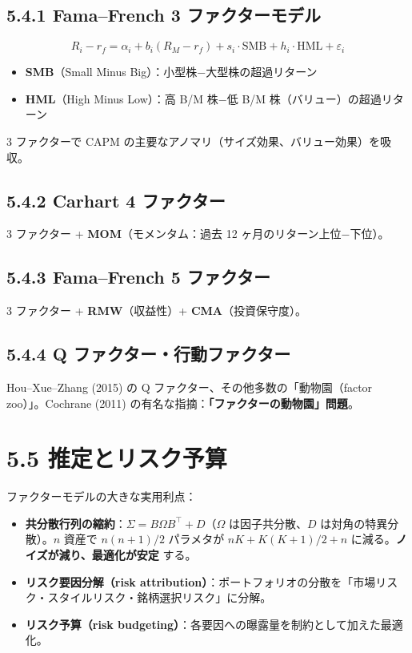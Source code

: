 \documentclass[11pt,a4paper]{report}
\begin{document}
\subsection{5.4.1 Fama–French 3 ファクターモデル}

\[ R_i - r_f = \alpha_i + b_i (R_M - r_f) + s_i \cdot \mathrm{SMB} + h_i \cdot \mathrm{HML} + \varepsilon_i \]
\begin{itemize}
\item \textbf{SMB}（Small Minus Big）：小型株−大型株の超過リターン
\item \textbf{HML}（High Minus Low）：高 B/M 株−低 B/M 株（バリュー）の超過リターン
\end{itemize}

3 ファクターで CAPM の主要なアノマリ（サイズ効果、バリュー効果）を吸収。

\subsection{5.4.2 Carhart 4 ファクター}

3 ファクター + \textbf{MOM}（モメンタム：過去 12 ヶ月のリターン上位−下位）。

\subsection{5.4.3 Fama–French 5 ファクター}

3 ファクター + \textbf{RMW}（収益性）+ \textbf{CMA}（投資保守度）。

\subsection{5.4.4 Q ファクター・行動ファクター}

Hou–Xue–Zhang (2015) の Q ファクター、その他多数の「動物園（factor zoo）」。Cochrane (2011) の有名な指摘：\textbf{「ファクターの動物園」問題}。

\section{5.5 推定とリスク予算}

ファクターモデルの大きな実用利点：

\begin{itemize}
\item \textbf{共分散行列の縮約}：$\Sigma = B \Omega B^\top + D$（$\Omega$ は因子共分散、$D$ は対角の特異分散）。$n$ 資産で $n(n+1)/2$ パラメタが $nK + K(K+1)/2 + n$ に減る。\textbf{ノイズが減り、最適化が安定} する。
\item \textbf{リスク要因分解（risk attribution）}：ポートフォリオの分散を「市場リスク・スタイルリスク・銘柄選択リスク」に分解。
\item \textbf{リスク予算（risk budgeting）}：各要因への曝露量を制約として加えた最適化。
\end{itemize}
\end{document}
